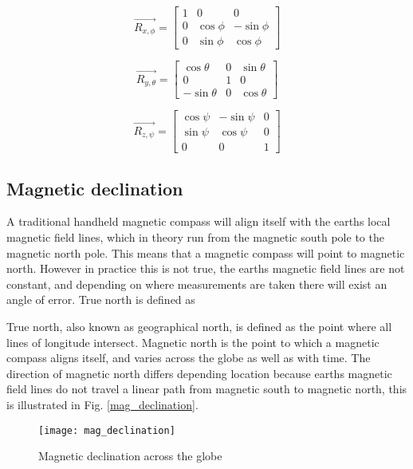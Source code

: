 \begin{equation}
    \vec{R_{x,\phi}} = \begin{bmatrix} 1 & 0 & 0 \\ 0 & \cos\phi & -\sin\phi \\ 0 & \sin\phi & \cos\phi \end{bmatrix}
    \label{eq:R_x}
\end{equation}

\begin{equation}
    \vec{R_{y,\theta}} = \begin{bmatrix} \cos\theta & 0 & \sin\theta \\ 0 & 1 & 0 \\ -\sin\theta & 0 & \cos\theta \end{bmatrix}
    \label{eq:R_y}
\end{equation}

\begin{equation}
    \vec{R_{z,\psi}} = \begin{bmatrix} \cos\psi & -\sin\psi & 0 \\ \sin\psi & \cos\psi & 0 \\ 0 & 0 & 1 \end{bmatrix}
    \label{eq:R_z}
\end{equation}

\subsection{Magnetic declination}

A traditional handheld magnetic compass will align itself with the earths local magnetic field lines, which in theory run from the magnetic south pole to the magnetic north pole. This 
means that a magnetic compass will point to magnetic north. However in practice this is not true, the earths magnetic field lines are not constant, and depending on where measurements
are taken there will exist an angle of error. True north is defined as  

True north, also known as geographical north, is defined as the point where all lines of longitude intersect. Magnetic north is the point to which a magnetic compass aligns itself, and 
varies across the globe as well as with time. The direction of magnetic north differs depending location because earths magnetic field lines do not travel a linear path from magnetic 
south to magnetic north, this is illustrated in Fig. \ref{mag_declination}. 

\begin{figure}[!h]
    \centering
    \texttt{[image: mag\_declination]}
    \caption[Magnetic declination across the globe]{Magnetic declination across the globe \cite{Mag_declination}}
    \label{fig:mag_declination}
\end{figure}



